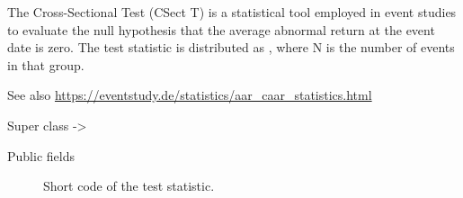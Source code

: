 \documentclass[a4paper]{book}
\begin{document}
%
\begin{Description}
The Cross-Sectional Test (CSect T) is a statistical tool employed in event
studies to evaluate the null hypothesis that the average abnormal return at
the event date is zero. The test statistic is distributed as , where
N is the number of events in that group.

See also \url{https://eventstudy.de/statistics/aar_caar_statistics.html}
\end{Description}
%
\begin{Section}{Super class}
 -> 
\end{Section}
%
\begin{Section}{Public fields}

\begin{description}

\item[] Short code of the test statistic.

\end{description}


\end{Section}
%
\end{document}
